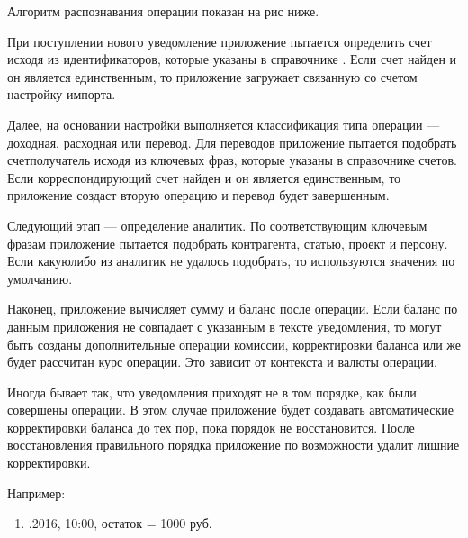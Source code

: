 \documentclass[a4paper,10pt,russian]{sphinxmanual}
\begin{document}
\sphinxAtStartPar
Алгоритм распознавания операции показан на рис ниже.


\sphinxAtStartPar
При поступлении нового уведомление приложение пытается определить счет исходя из идентификаторов,
которые указаны в справочнике . Если счет найден и он является единственным, то приложение
загружает связанную со счетом настройку импорта.

\sphinxAtStartPar
Далее, на основании настройки выполняется классификация типа операции — доходная, расходная или перевод.
Для переводов приложение пытается подобрать счет\sphinxhyphen{}получатель исходя из ключевых фраз,
которые указаны в справочнике счетов. Если корреспондирующий счет найден и он является единственным, то
приложение создаст вторую операцию и перевод будет завершенным.

\sphinxAtStartPar
Следующий этап — определение аналитик. По соответствующим ключевым фразам приложение пытается подобрать
контрагента, статью, проект и персону. Если какую\sphinxhyphen{}либо из
аналитик не удалось подобрать, то используются значения по умолчанию.

\sphinxAtStartPar
Наконец, приложение вычисляет сумму и баланс после операции. Если баланс по данным приложения не совпадает
с указанным в тексте уведомления, то могут быть созданы дополнительные операции комиссии, корректировки баланса
или же будет рассчитан курс операции. Это зависит от контекста и валюты операции.

\sphinxAtStartPar
Иногда бывает так, что уведомления приходят не в том порядке, как были совершены операции. В этом случае приложение
будет создавать автоматические корректировки баланса до тех пор, пока порядок не восстановится. После восстановления
правильного порядка приложение по возможности удалит лишние корректировки.

\sphinxAtStartPar
Например:
\begin{enumerate}
%
\item {} 
.2016, 10:00, остаток = 1000 руб.

\end{enumerate}
\end{document}
